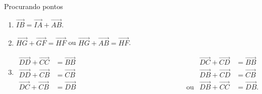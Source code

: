 \begin{answer}{Procurando pontos}
{
\begin{enumerate}
\item {} 
\(\overrightarrow{IB} = \overrightarrow{IA} + \overrightarrow{AB}\).

\item {} 
\(\overrightarrow{HG} + \overrightarrow{GF} = \overrightarrow{HF}\) ou \(\overrightarrow{HG} + \overrightarrow{AB} = \overrightarrow{HF}\).

\item {} 
\begin{align*}
\overrightarrow{DD} + \overrightarrow{CC} &= \overrightarrow{BB} &
\overrightarrow{DC} + \overrightarrow{CD} &= \overrightarrow{BB} \\       
\overrightarrow{DD} + \overrightarrow{CB} &= \overrightarrow{CB} & 
\overrightarrow{DB} + \overrightarrow{CD} &= \overrightarrow{CB} \\       
\overrightarrow{DC} + \overrightarrow{CB} &= \overrightarrow{DB}\text{ { }{ }{ }{ }{ }{ }{ }{ }{ }{ }{ }{ }{ }{ }{ }{ }{ }{ }{ }{ }{ }{ }{ ou}} & 
\overrightarrow{DB} + \overrightarrow{CC} &= \overrightarrow{DB}.
\end{align*}


\end{enumerate}}
\end{answer}
